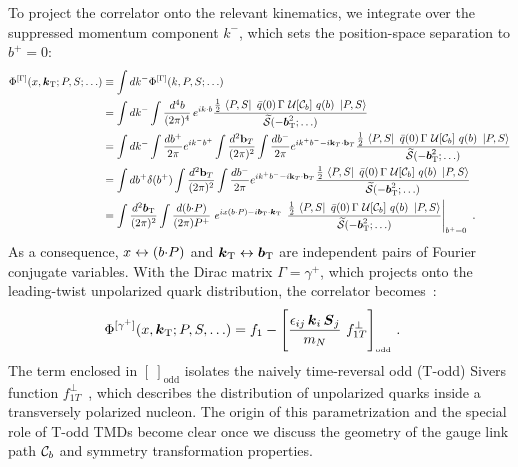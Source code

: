To project the correlator onto the relevant kinematics, we integrate over the suppressed momentum component $k^-$, which sets the position-space separation to $b^+ = 0$:
\begingroup\footnotesize
\begin{align}
	\Phi^{[\Gamma]}(x,\vprp{k};P,S;\ldots) & \equiv \int dk^{-} \Phi^{[\Gamma]}(\kei,P,S;\ldots) \nonumber \\ 
 &=\int dk^{-}\int \frac{d^4 \bvec}{(2\pi)^4}\, e^{i \kei\cdot \bvec} \frac{\frac{1}{2}\, \bra{P,S}\ \bar{q}(0)\, \Gamma\ \WlineC{\mathcal{C}_\bvec}\ q(\bvec)\ \ket{P,S}}{ \widetilde{\mathcal{S}}(-\vprp{\bvec}^2;\ldots) }\\
 &=\int dk^{-}\int \frac{db^{+}}{2\pi}e^{ik^-b^+}\int \frac{d^2\textbf{b}_T}{(2\pi)^2}\int \frac{db^-}{2\pi}e^{ik^+b^--i\textbf{k}_T\tcdot\textbf{b}_T}\frac{\frac{1}{2}\, \bra{P,S}\ \bar{q}(0)\, \Gamma\ \WlineC{\mathcal{C}_\bvec}\ q(\bvec)\ \ket{P,S}}{ \widetilde{\mathcal{S}}(-\vprp{\bvec}^2;\ldots) }\\
 &=\int {db^{+}}\delta(b^+)\int \frac{d^2\textbf{b}_T}{(2\pi)^2}\int \frac{db^-}{2\pi}e^{ik^+b^--i\textbf{k}_T\tcdot\textbf{b}_T}\frac{\frac{1}{2}\, \bra{P,S}\ \bar{q}(0)\, \Gamma\ \WlineC{\mathcal{C}_\bvec}\ q(\bvec)\ \ket{P,S}}{ \widetilde{\mathcal{S}}(-\vprp{\bvec}^2;\ldots) }\\
	& =\int \frac{d^2 \vprp{\bvec}}{(2\pi)^2} \int \frac{d (\bvec \tcdot P)}{(2\pi) P^+}\ e^{i x (\bvec \tcdot P) - i\vprp{\bvec} \tcdot \vprp{\kei}}\,
		\left. \frac{\frac{1}{2}\, \bra{P,S}\ \bar{q}(0)\, \Gamma\ \WlineC{\mathcal{C}_\bvec}\ q(\bvec)\ \ket{P,S}}
		{ \widetilde{\mathcal{S}}(-\vprp{\bvec}^2;\ldots) } \right|_{b^+ = 0} \ .
\end{align}
\endgroup
As a consequence, $x \leftrightarrow (b {\cdot} P)$ and $\boldsymbol{k}_{\mathrm T} \leftrightarrow \boldsymbol{b}_{\mathrm T}$ are independent pairs of Fourier conjugate variables.
With the Dirac matrix $\Gamma = \gamma^+$, which projects onto the leading-twist unpolarized quark distribution, the correlator becomes~\cite{Ralston:1979ys, Tangerman:1994eh,Mulders:1995dh,Goeke:2005hb}:
\begin{align}
	\Phi^{[\gamma^+]}(x,\vprp{k};P,S,\ldots) & = f_1 - \toddmark{\frac{\myeps_{ij}\, \vect{k}_{i}\, \vect{S}_{j}}{m_N}\ f_{1T}^\prp} \label{eq-phigammaplus}\ . 
\end{align}
The term enclosed in $[\ ]_\text{odd}$ isolates the naively time-reversal odd (T-odd) Sivers function $f_{1T}^\perp$~\cite{Sivers:1989cc}, which describes the distribution of unpolarized quarks inside a transversely polarized nucleon. The origin of this parametrization and the special role of T-odd TMDs become clear once we discuss the geometry of the gauge link path $\mathcal{C}_b $ and symmetry transformation properties.

